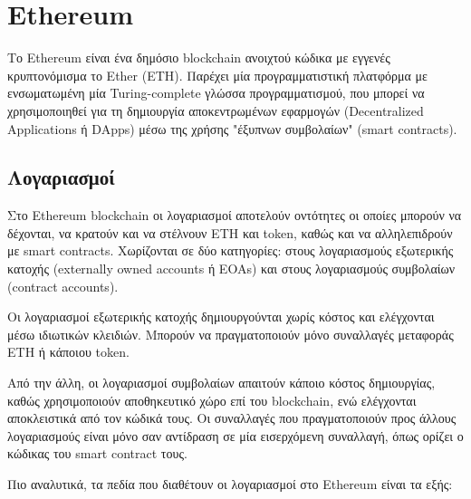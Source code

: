 \section{Ethereum} \label{section:2-6-ethereum}


Το Ethereum είναι ένα δημόσιο blockchain ανοιχτού κώδικα με εγγενές κρυπτονόμισμα το Ether (ETH). Παρέχει μία προγραμματιστική πλατφόρμα με ενσωματωμένη μία Turing-complete γλώσσα προγραμματισμού, που μπορεί να χρησιμοποιηθεί για τη δημιουργία αποκεντρωμένων εφαρμογών (Decentralized Applications ή DApps) μέσω της χρήσης "έξυπνων συμβολαίων" (smart contracts).\cite{2.6-ethereum-whitepaper}

\subsection{Λογαριασμοί} \label{subsection:2-6-1-ethereum-accounts}
Στο Ethereum blockchain οι λογαριασμοί αποτελούν οντότητες οι οποίες μπορούν να δέχονται, να κρατούν και να στέλνουν ETH και token, καθώς και να αλληλεπιδρούν με smart contracts.\cite{2.6-ethereum-documentation} Χωρίζονται σε δύο κατηγορίες: στους λογαριασμούς εξωτερικής κατοχής (\textenglish{externally owned accounts} ή EOAs) και στους λογαριασμούς συμβολαίων (contract accounts).

Οι λογαριασμοί εξωτερικής κατοχής δημιουργούνται χωρίς κόστος και ελέγχονται μέσω ιδιωτικών κλειδιών. Μπορούν να πραγματοποιούν μόνο συναλλαγές μεταφοράς ETH ή κάποιου token.

Από την άλλη, οι λογαριασμοί συμβολαίων απαιτούν κάποιο κόστος δημιουργίας, καθώς χρησιμοποιούν αποθηκευτικό χώρο επί του blockchain, ενώ ελέγχονται αποκλειστικά από τον κώδικά τους. Οι συναλλαγές που πραγματοποιούν προς άλλους λογαριασμούς είναι μόνο σαν αντίδραση σε μία εισερχόμενη συναλλαγή, όπως ορίζει ο κώδικας του smart contract τους.

Πιο αναλυτικά, τα πεδία που διαθέτουν οι λογαριασμοί στο Ethereum είναι τα εξής:

